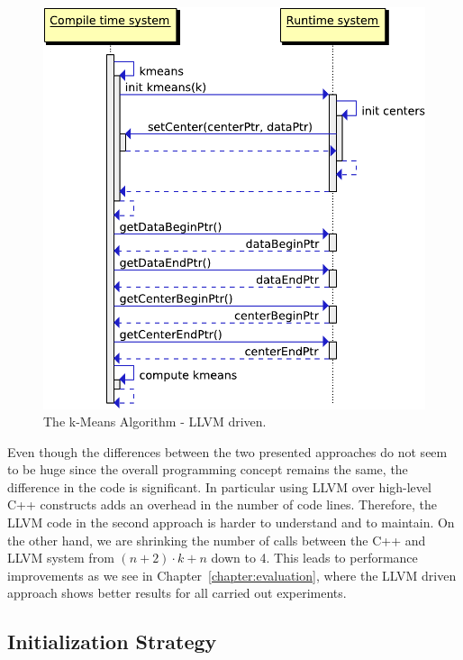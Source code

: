 \begin{figure}[htsb]
  \centering
  \includegraphics[scale=0.4]{figures/llvm_driven}
  \caption[The k-Means Algorithm - LLVM driven]{The k-Means Algorithm - LLVM driven.}
  \label{fig:llvm_driven}
\end{figure}



Even though the differences between the two presented approaches do not seem to be huge since the overall programming concept remains the same, the difference in the code is significant. In particular using LLVM over high-level C++ constructs adds an overhead in the number of code lines. Therefore, the LLVM code in the second approach is harder to understand and to maintain. On the other hand, we are shrinking the number of calls between the C++ and LLVM system from $(n + 2) \cdot k + n$ down to 4. This leads to performance improvements as we see in Chapter~\ref{chapter:evaluation}, where the LLVM driven approach shows better results for all carried out experiments.


\subsection{Initialization Strategy}\label{sub:init}

